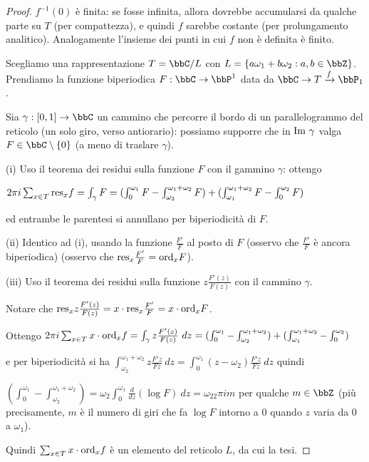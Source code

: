 \begin{proof}
$f^{-1}(0)$ è finita: se fosse infinita, allora dovrebbe accumularsi da qualche parte su $T$ (per compattezza), e quindi $f$ sarebbe costante (per prolungamento analitico).
Analogamente l'insieme dei punti in cui $f$ non è definita è finito.

Scegliamo una rappresentazione $T=\bbC/L$ con $L=\{a\omega_1+b\omega_2 : a,b\in\bbZ\}$. Prendiamo la funzione biperiodica $F:\bbC\rar\bbP^1$ data da $\bbC\rar T\xrightarrow{f}\bbP_1$.

Sia $\gamma:[0,1]\rar\bbC$ un cammino che percorre il bordo di un parallelogrammo del reticolo (un solo giro, verso antiorario):
possiamo supporre che in $\text{Im }\gamma$ valga $F\in\bbC\setminus\{0\}$ (a meno di traslare $\gamma$).

(i) Uso il teorema dei residui sulla funzione $F$ con il gammino $\gamma$: ottengo

$2\pi i\sum_{x\in T}\text{res}_xf=\int_\gamma F=(\int_0^{\omega_1}F-\int_{\omega_2}^{\omega_1+\omega_2}F)+(\int_{\omega_1}^{\omega_1+\omega_2}F-\int_{0}^{\omega_2}F)$

ed entrambe le parentesi si annullano per biperiodicità di $F$.


(ii) Identico ad (i), usando la funzione $\frac{F'}{F}$ al posto di $F$ (osservo che $\frac{F'}{F}$ è ancora biperiodica) (osservo che $\text{res}_x\frac{F'}{F}=\text{ord}_xF$).

(iii) Uso il teorema dei residui sulla funzione $z\frac{F'(z)}{F(z)}$ con il cammino $\gamma$.

Notare che $\text{res}_xz\frac{F'(z)}{F(z)}=x\cdot\text{res}_x\frac{F'}{F}=x\cdot\text{ord}_xF$.

Ottengo $2\pi i\sum_{x\in T}x\cdot\ord_xf=\int_\gamma z\frac{F'(z)}{F(z)}\ dz=(\int_0^{\omega_1}-\int_{\omega_2}^{\omega_1+\omega_2})+(\int_{\omega_1}^{\omega_1+\omega_2}-\int_{0}^{\omega_2})$

e per biperiodicità si ha $\int_{\omega_2}^{\omega_1+\omega_2}z\frac{F'z}{Fz}\ dz=\int_0^{\omega_1}(z-\omega_2)\frac{F'z}{Fz}\ dz$ quindi

$(\int_0^{\omega_1}-\int_{\omega_2}^{\omega_1+\omega_2})=\omega_2\int_0^{\omega_1}\frac{d}{dz}(\log F)\ dz=\omega_22\pi i m$ per qualche $m\in\bbZ$
(più precisamente, $m$ è il numero di giri che fa $\log F$ intorno a $0$ quando $z$ varia da $0$ a $\omega_1$).

Quindi $\sum_{x\in T}x\cdot\text{ord}_xf$ è un elemento del reticolo $L$, da cui la tesi.
\end{proof}


